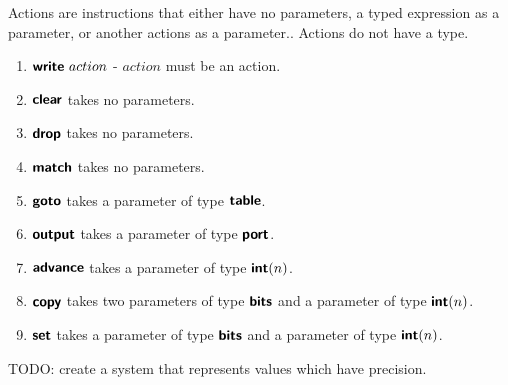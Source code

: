 Actions are instructions that either have no parameters, a typed expression as a parameter, or another actions as a parameter.. Actions do not have a type.
\begin{enumerate}
  \item $\bm{\mathsf{{write}}} \ action$ - $action$ must be an action.
  \item $\bm{\mathsf{{clear}}}$ takes no parameters.
  \item $\bm{\mathsf{{drop}}}$ takes no parameters.
  \item $\bm{\mathsf{{match}}}$ takes no parameters.
  \item $\bm{\mathsf{{goto}}}$ takes a parameter of type $\bm{\mathsf{{table}}}$.
  \item $\bm{\mathsf{{output}}}$ takes a parameter of type $\bm{\mathsf{{port}}}$.
  \item $\bm{\mathsf{{advance}}}$ takes a parameter of type $\bm{\mathsf{{int}}}(n)$.
  \item $\bm{\mathsf{{copy}}}$ takes two parameters of type $\bm{\mathsf{{bits}}}$ and a parameter of type $\bm{\mathsf{{int}}}(n)$.
  \item $\bm{\mathsf{{set}}}$ takes a parameter of type $\bm{\mathsf{{bits}}}$ and a parameter of type $\bm{\mathsf{{int}}}(n)$.
\end{enumerate}

TODO: create a system that represents values which have precision.
